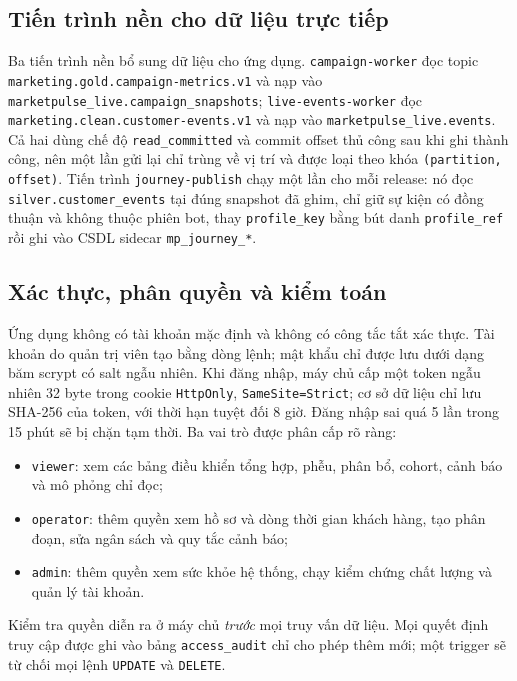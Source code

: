 \subsection{Tiến trình nền cho dữ liệu trực tiếp}
\label{sec:c4-workers}
Ba tiến trình nền bổ sung dữ liệu cho ứng dụng. \texttt{campaign-worker} đọc topic \texttt{marketing.gold.campaign-metrics.v1} và nạp vào \texttt{marketpulse\_live.campaign\_snapshots}; \texttt{live-events-worker} đọc \texttt{marketing.clean.customer-events.v1} và nạp vào \texttt{marketpulse\_live.events}. Cả hai dùng chế độ \texttt{read\_committed} và commit offset thủ công sau khi ghi thành công, nên một lần gửi lại chỉ trùng về vị trí và được loại theo khóa \texttt{(partition, offset)}. Tiến trình \texttt{journey-publish} chạy một lần cho mỗi release: nó đọc \texttt{silver.customer\_events} tại đúng snapshot đã ghim, chỉ giữ sự kiện có đồng thuận và không thuộc phiên bot, thay \texttt{profile\_key} bằng bút danh \texttt{profile\_ref} rồi ghi vào CSDL sidecar \texttt{mp\_journey\_*}.

\subsection{Xác thực, phân quyền và kiểm toán}
\label{sec:c4-rbac}
Ứng dụng không có tài khoản mặc định và không có công tắc tắt xác thực. Tài khoản do quản trị viên tạo bằng dòng lệnh; mật khẩu chỉ được lưu dưới dạng băm scrypt có salt ngẫu nhiên. Khi đăng nhập, máy chủ cấp một token ngẫu nhiên 32 byte trong cookie \texttt{HttpOnly}, \texttt{SameSite=Strict}; cơ sở dữ liệu chỉ lưu SHA-256 của token, với thời hạn tuyệt đối 8 giờ. Đăng nhập sai quá 5 lần trong 15 phút sẽ bị chặn tạm thời. Ba vai trò được phân cấp rõ ràng:

\begin{itemize}
    \item \texttt{viewer}: xem các bảng điều khiển tổng hợp, phễu, phân bổ, cohort, cảnh báo và mô phỏng chỉ đọc;
    \item \texttt{operator}: thêm quyền xem hồ sơ và dòng thời gian khách hàng, tạo phân đoạn, sửa ngân sách và quy tắc cảnh báo;
    \item \texttt{admin}: thêm quyền xem sức khỏe hệ thống, chạy kiểm chứng chất lượng và quản lý tài khoản.
\end{itemize}

Kiểm tra quyền diễn ra ở máy chủ \emph{trước} mọi truy vấn dữ liệu. Mọi quyết định truy cập được ghi vào bảng \texttt{access\_audit} chỉ cho phép thêm mới; một trigger sẽ từ chối mọi lệnh \texttt{UPDATE} và \texttt{DELETE}.


